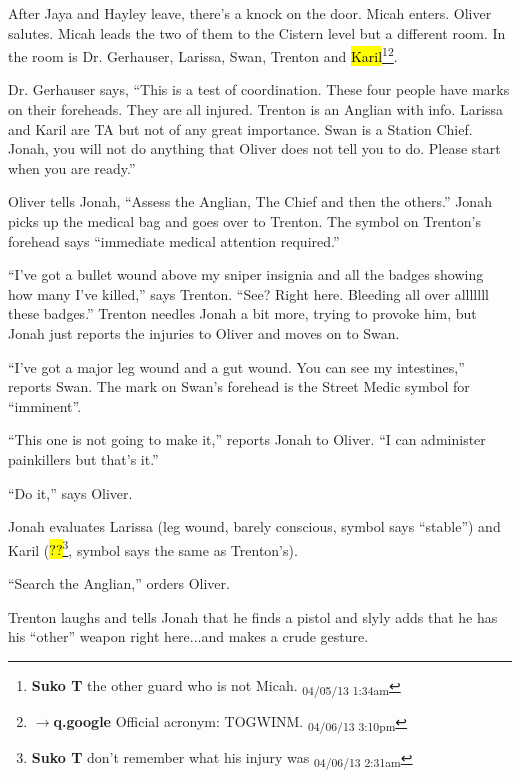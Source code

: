 
After Jaya and Hayley leave, there's a knock on the door.  Micah enters. Oliver salutes.  Micah leads the two of them to the Cistern level but a different room.  In the room is Dr. Gerhauser, Larissa, Swan, Trenton and \hl{Karil}\footnote{\textbf{Suko T }the other guard who is not Micah. \textsubscript{04/05/13 1:34am}}\footnote{$\rightarrow$\textbf{q.google }Official acronym: TOGWINM. \textsubscript{04/06/13 3:10pm}}. 



Dr. Gerhauser says, ``This is a test of coordination.  These four people have marks on their foreheads.  They are all injured.  Trenton is an Anglian with info.  Larissa and Karil are TA but not of any great importance.  Swan is a Station Chief.  Jonah, you will not do anything that Oliver does not tell you to do.  Please start when you are ready.''



Oliver tells Jonah, ``Assess the Anglian, The Chief and then the others.''  Jonah picks up the medical bag and goes over to Trenton.  The symbol on Trenton's forehead says  ``immediate medical attention required.''



``I've got a bullet wound above my sniper insignia and all the badges showing how many I've killed,'' says Trenton.  ``See?  Right here.  Bleeding all over alllllll these badges.''  Trenton needles Jonah a bit more, trying to provoke him, but Jonah just reports the injuries to Oliver and moves on to Swan.  



``I've got a major leg wound and a gut wound.  You can see my intestines,'' reports Swan.  The mark on Swan's forehead is the Street Medic symbol for ``imminent''.



``This one is not going to make it,'' reports Jonah to Oliver.  ``I can administer painkillers but that's it.''

``Do it,'' says Oliver.



Jonah evaluates Larissa (leg wound, barely conscious, symbol says ``stable'') and Karil (\hl{??}\footnote{\textbf{Suko T }don't remember what his injury was \textsubscript{04/06/13 2:31am}}, symbol says the same as Trenton's).

``Search the Anglian,'' orders Oliver.  

Trenton laughs and tells Jonah that he finds a pistol and slyly adds that he has his ``other'' weapon right here...and makes a crude gesture.

